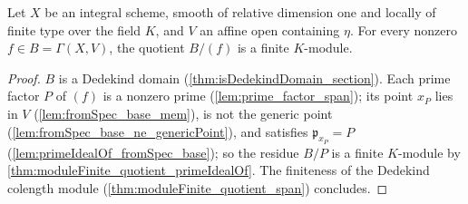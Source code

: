 \begin{theorem}
  \label{thm:moduleFinite_quotient_span_section}
  \leanok
  Let \(X\) be an integral scheme, smooth of relative dimension one and locally of
  finite type over the field \(K\), and \(V\) an affine open containing \(\eta\).
  For every nonzero \(f \in B = \Gamma(X, V)\), the quotient \(B/(f)\) is a finite
  \(K\)-module.
\end{theorem}
\begin{proof}
  \leanok
  \(B\) is a Dedekind domain (\ref{thm:isDedekindDomain_section}). Each prime factor
  \(P\) of \((f)\) is a nonzero prime (\ref{lem:prime_factor_span}); its point
  \(x_P\) lies in \(V\) (\ref{lem:fromSpec_base_mem}), is not the generic point
  (\ref{lem:fromSpec_base_ne_genericPoint}), and satisfies
  \(\mathfrak p_{x_P} = P\) (\ref{lem:primeIdealOf_fromSpec_base}); so the residue
  \(B/P\) is a finite \(K\)-module by
  \ref{thm:moduleFinite_quotient_primeIdealOf}. The finiteness of the Dedekind
  colength module (\ref{thm:moduleFinite_quotient_span}) concludes.
\end{proof}


